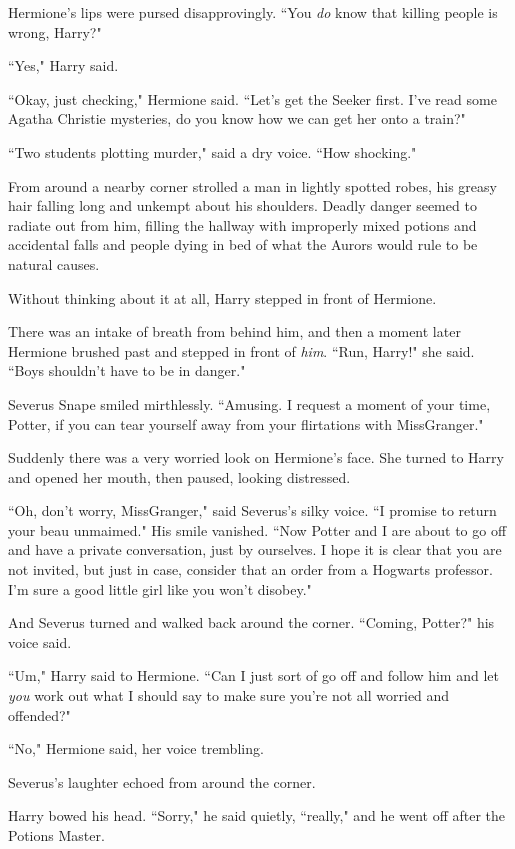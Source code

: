 Hermione's lips were pursed disapprovingly. ``You \emph{do} know that killing people is wrong, Harry?"

``Yes," Harry said.

``Okay, just checking," Hermione said. ``Let's get the Seeker first. I've read some Agatha Christie mysteries, do you know how we can get her onto a train?"

``Two students plotting murder," said a dry voice. ``How shocking."

From around a nearby corner strolled a man in lightly spotted robes, his greasy hair falling long and unkempt about his shoulders. Deadly danger seemed to radiate out from him, filling the hallway with improperly mixed potions and accidental falls and people dying in bed of what the Aurors would rule to be natural causes.

Without thinking about it at all, Harry stepped in front of Hermione.

There was an intake of breath from behind him, and then a moment later Hermione brushed past and stepped in front of \emph{him}. ``Run, Harry!" she said. ``Boys shouldn't have to be in danger."

Severus Snape smiled mirthlessly. ``Amusing. I request a moment of your time, Potter, if you can tear yourself away from your flirtations with Miss\?Granger."

Suddenly there was a very worried look on Hermione's face. She turned to Harry and opened her mouth, then paused, looking distressed.

``Oh, don't worry, Miss\?Granger," said Severus's silky voice. ``I promise to return your beau unmaimed." His smile vanished. ``Now Potter and I are about to go off and have a private conversation, just by ourselves. I hope it is clear that you are not invited, but just in case, consider that an order from a Hogwarts professor. I'm sure a good little girl like you won't disobey."

And Severus turned and walked back around the corner. ``Coming, Potter?" his voice said.

``Um," Harry said to Hermione. ``Can I just sort of go off and follow him and let \emph{you} work out what I should say to make sure you're not all worried and offended?"

``No," Hermione said, her voice trembling.

Severus's laughter echoed from around the corner.

Harry bowed his head. ``Sorry," he said quietly, ``really," and he went off after the Potions Master.

